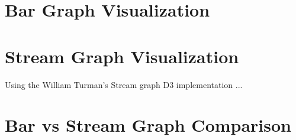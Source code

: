 \documentclass[12pt]{article}
\begin{document}
\section{Bar Graph Visualization} \label{bar}


\section{Stream Graph Visualization} \label{stream}
Using the William Turman's Stream graph D3 implementation \cite{Stream}...

%

\section{Bar vs Stream Graph Comparison}
 



\end{document}

